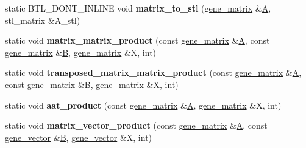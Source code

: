 \begin{DoxyCompactItemize}
static B\+T\+L\+\_\+\+D\+O\+N\+T\+\_\+\+I\+N\+L\+I\+NE void {\bfseries matrix\+\_\+to\+\_\+stl} (\hyperlink{group___core___module_class_eigen_1_1_matrix}{gene\+\_\+matrix} \&\hyperlink{group___core___module_class_eigen_1_1_matrix}{A}, stl\+\_\+matrix \&A\+\_\+stl)
\item 
\mbox{\label{classeigen3__interface_a587bfaf9e3c5b329bd8805b07fbdef7f}} 
static void {\bfseries matrix\+\_\+matrix\+\_\+product} (const \hyperlink{group___core___module_class_eigen_1_1_matrix}{gene\+\_\+matrix} \&\hyperlink{group___core___module_class_eigen_1_1_matrix}{A}, const \hyperlink{group___core___module_class_eigen_1_1_matrix}{gene\+\_\+matrix} \&\hyperlink{group___core___module_class_eigen_1_1_matrix}{B}, \hyperlink{group___core___module_class_eigen_1_1_matrix}{gene\+\_\+matrix} \&X, int)
\item 
\mbox{\label{classeigen3__interface_aace9786088c23d20fe54da2a6f2fcab5}} 
static void {\bfseries transposed\+\_\+matrix\+\_\+matrix\+\_\+product} (const \hyperlink{group___core___module_class_eigen_1_1_matrix}{gene\+\_\+matrix} \&\hyperlink{group___core___module_class_eigen_1_1_matrix}{A}, const \hyperlink{group___core___module_class_eigen_1_1_matrix}{gene\+\_\+matrix} \&\hyperlink{group___core___module_class_eigen_1_1_matrix}{B}, \hyperlink{group___core___module_class_eigen_1_1_matrix}{gene\+\_\+matrix} \&X, int)
\item 
\mbox{\label{classeigen3__interface_ae17740e993b1c0e6228433d49eda6e0d}} 
static void {\bfseries aat\+\_\+product} (const \hyperlink{group___core___module_class_eigen_1_1_matrix}{gene\+\_\+matrix} \&\hyperlink{group___core___module_class_eigen_1_1_matrix}{A}, \hyperlink{group___core___module_class_eigen_1_1_matrix}{gene\+\_\+matrix} \&X, int)
\item 
\mbox{\label{classeigen3__interface_ac6b34299d6470309cc1ce39d827bc3dc}} 
static void {\bfseries matrix\+\_\+vector\+\_\+product} (const \hyperlink{group___core___module_class_eigen_1_1_matrix}{gene\+\_\+matrix} \&\hyperlink{group___core___module_class_eigen_1_1_matrix}{A}, const \hyperlink{group___core___module_class_eigen_1_1_matrix}{gene\+\_\+vector} \&\hyperlink{group___core___module_class_eigen_1_1_matrix}{B}, \hyperlink{group___core___module_class_eigen_1_1_matrix}{gene\+\_\+vector} \&X, int)

\end{DoxyCompactItemize}
